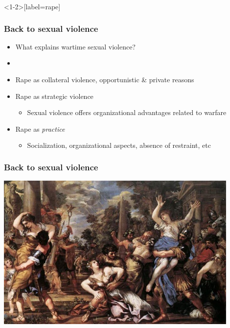 \documentclass[utf8, xcolor=dvipsnames]{beamer}
\begin{document}
\begin{frame}<1-2>[label=rape]
\frametitle{Back to sexual violence}
\centering

\begin{itemize}
  \item<1-> What explains wartime sexual violence?
  \item[]
  \item<2-> Rape as collateral violence, opportunistic \& private reasons
  \item<3-> Rape as strategic violence
  \begin{itemize}
    \item Sexual violence offers organizational advantages related to warfare
  \end{itemize}
  \item<4-> Rape as \textit{practice}
  \begin{itemize}
    \item Socialization, organizational aspects, absence of restraint, etc
  \end{itemize}
\end{itemize}

\end{frame}

\begin{frame}
\frametitle{Back to sexual violence}
\centering

\includegraphics[width = 0.9\textwidth]{img/rape_history}

\end{frame}

\end{document}
